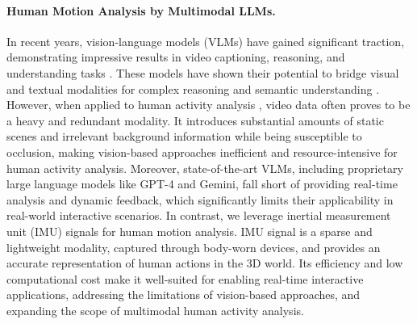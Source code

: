\vspace{-4mm}
\paragraph{Human Motion Analysis by Multimodal LLMs.}
In recent years, vision-language models (VLMs) have gained significant traction, demonstrating impressive results in video captioning, reasoning, and understanding tasks \cite{feng2024chatpose,chen2024motionllm,wang2024internvideo2,li2024human,internlmxcomposer,internlmxcomposer2,internlmxcomposer2_4khd,internlmxcomposer2_5}. These models have shown their potential to bridge visual and textual modalities for complex reasoning and semantic understanding \cite{jiang2024motionchain,bao2024exploiting,lin2024chathuman,li2024techcoach,han2023imagebind}. However, when applied to human activity analysis \cite{chen2024internvl2,li2024mvbench,zhang2024narrative}, video data often proves to be a heavy and redundant modality. It introduces substantial amounts of static scenes and irrelevant background information while being susceptible to occlusion, making vision-based approaches inefficient and resource-intensive for human activity analysis. Moreover, state-of-the-art VLMs, including proprietary large language models like GPT-4 and Gemini, fall short of providing real-time analysis and dynamic feedback, which significantly limits their applicability in real-world interactive scenarios. In contrast, we leverage inertial measurement unit (IMU) signals for human motion analysis\cite{li2024sensorllm,moon2022imu2clip,moon2024anymal,girdhar2023imagebind}. IMU signal is a sparse and lightweight modality, captured through body-worn devices, and provides an accurate representation of human actions in the 3D world. Its efficiency and low computational cost make it well-suited for enabling real-time interactive applications, addressing the limitations of vision-based approaches, and expanding the scope of multimodal human activity analysis.